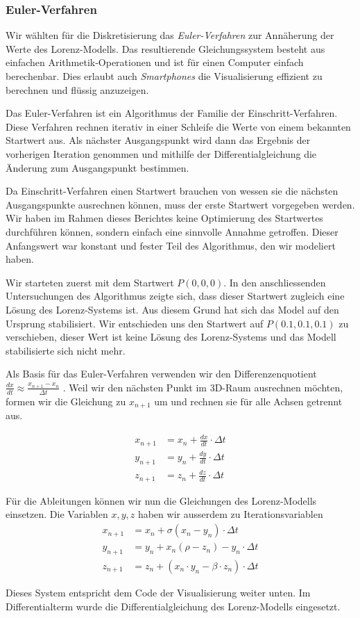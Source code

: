 \subsubsection{Euler-Verfahren} \label{euler-verfahren}

Wir wählten für die Diskretisierung das \textit{Euler-Verfahren} zur Annäherung der Werte des Lorenz-Modells. Das resultierende Gleichungssystem besteht aus einfachen Arithmetik-Operationen und ist für einen Computer einfach berechenbar. Dies erlaubt auch \textit{Smartphones} die Visualisierung effizient zu berechnen und flüssig anzuzeigen.

Das Euler-Verfahren ist ein Algorithmus der Familie der Einschritt-Verfahren. Diese Verfahren rechnen iterativ in einer Schleife die Werte von einem bekannten Startwert aus. Als nächster Ausgangspunkt wird dann das Ergebnis der vorherigen Iteration genommen und mithilfe der Differentialgleichung die Änderung zum Ausgangspunkt bestimmen. 

Da Einschritt-Verfahren einen Startwert brauchen von wessen sie die nächsten Ausgangspunkte ausrechnen können, muss der erste Startwert vorgegeben werden. Wir haben im Rahmen dieses Berichtes keine Optimierung des Startwertes durchführen können, sondern einfach eine sinnvolle Annahme getroffen. Dieser Anfangswert war konstant und fester Teil des Algorithmus, den wir modeliert haben.

Wir starteten zuerst mit dem Startwert $ P(0, 0, 0) $. In den anschliessenden Untersuchungen des Algorithmus zeigte sich, dass dieser Startwert zugleich eine Lösung des Lorenz-Systems ist. Aus diesem Grund hat sich das Model auf den Ursprung stabilisiert. Wir entschieden uns den Startwert auf $ P(0.1, 0.1, 0.1) $ zu verschieben, dieser Wert ist keine Lösung des Lorenz-Systems und das Modell stabilisierte sich nicht mehr.

Als Basis für das Euler-Verfahren verwenden wir den Differenzenquotient $ \frac{dx}{dt} \approx \frac{x_{n + 1} - x_n}{\Delta t} $ \cite{dahmen2008}.  Weil wir den nächsten Punkt im 3D-Raum ausrechnen möchten, formen wir die Gleichung zu $ x_{n + 1} $  um und rechnen sie für alle Achsen getrennt aus.

\begin{align}
    x_{n + 1} &= x_n + \frac{dx}{dt} \cdot \Delta t\\
    y_{n + 1} &= y_n + \frac{dy}{dt} \cdot \Delta t\\
    z_{n + 1} &= z_n + \frac{dz}{dt} \cdot \Delta t
\end{align}

Für die Ableitungen können wir nun die Gleichungen des Lorenz-Modells einsetzen. Die Variablen $ x, y, z $ haben wir ausserdem zu Iterationsvariablen 
\begin{align}
    x_{n + 1} &= x_n + \sigma(x_n - y_n) \cdot \Delta t\\
    y_{n + 1} &= y_n + x_n(\rho - z_n) - y_n \cdot \Delta t\\
    z_{n + 1} &= z_n + (x_n \cdot y_n - \beta \cdot z_n) \cdot \Delta t
\end{align}

Dieses System entspricht dem Code der Visualisierung weiter unten. Im Differentialterm wurde die Differentialgleichung des Lorenz-Modells eingesetzt.
